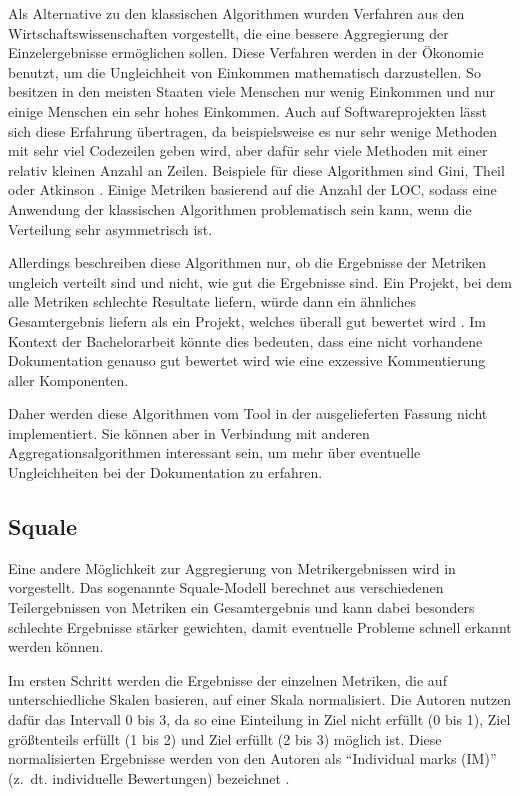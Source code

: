 Als Alternative zu den klassischen Algorithmen wurden Verfahren aus den Wirtschaftswissenschaften vorgestellt, die eine bessere Aggregierung der Einzelergebnisse ermöglichen sollen. Diese Verfahren werden in der Ökonomie benutzt, um die Ungleichheit von Einkommen mathematisch darzustellen. So besitzen in den meisten Staaten viele Menschen nur wenig Einkommen und nur einige Menschen ein sehr hohes Einkommen. Auch auf Softwareprojekten lässt sich diese Erfahrung übertragen, da beispielsweise es nur sehr wenige Methoden mit sehr viel Codezeilen geben wird, aber dafür sehr viele Methoden mit einer relativ kleinen Anzahl an Zeilen. Beispiele für diese Algorithmen sind Gini, Theil oder Atkinson \cite[S. 314]{Youcantcontroltheunfamiliar:Astudyontherelationsbetweenaggregationtechniquesforsoftwaremetrics}. Einige Metriken  basierend auf die Anzahl der \ac{LOC}, sodass eine Anwendung der klassischen Algorithmen problematisch sein kann, wenn die Verteilung sehr asymmetrisch ist. 
 
 Allerdings beschreiben diese Algorithmen nur, ob die Ergebnisse der Metriken ungleich verteilt sind und nicht, wie gut die Ergebnisse sind. Ein Projekt, bei dem alle Metriken schlechte Resultate liefern, würde dann ein ähnliches Gesamtergebnis liefern als ein Projekt, welches überall gut bewertet wird \cite[S. 1121]{Softwarequalitymetricsaggregationinindustry}.  Im Kontext der Bachelorarbeit könnte dies bedeuten, dass eine nicht vorhandene Dokumentation genauso gut bewertet wird wie eine exzessive Kommentierung aller Komponenten. 
 
 Daher werden diese Algorithmen vom Tool in der ausgelieferten Fassung nicht implementiert. Sie können aber in Verbindung mit anderen Aggregationsalgorithmen interessant sein, um mehr über eventuelle Ungleichheiten bei der Dokumentation zu erfahren.
 
 \subsection{Squale}
 Eine andere Möglichkeit zur Aggregierung von Metrikergebnissen wird in \cite[S. 1124]{Softwarequalitymetricsaggregationinindustry} vorgestellt. Das sogenannte Squale-Modell berechnet aus verschiedenen Teilergebnissen von Metriken ein Gesamtergebnis und kann dabei besonders schlechte Ergebnisse stärker gewichten, damit eventuelle Probleme schnell erkannt werden können. 
 
 Im ersten Schritt werden die Ergebnisse der einzelnen Metriken, die auf unterschiedliche Skalen basieren, auf einer Skala normalisiert. Die Autoren nutzen dafür das Intervall 0 bis 3, da so eine Einteilung in Ziel nicht erfüllt (0 bis 1), Ziel größtenteils erfüllt (1 bis 2) und Ziel erfüllt (2 bis 3) möglich ist. Diese normalisierten Ergebnisse werden von den Autoren als \enquote{Individual marks (IM)} (z.~dt. individuelle Bewertungen) bezeichnet \cite[S. 142]{AnEmpiricalModelforContinuousandWeightedMetricAggregation}. 
 
